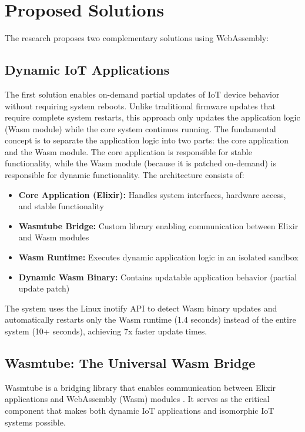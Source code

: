 \documentclass[11pt]{article}
\begin{document}
\section{Proposed Solutions}

The research proposes two complementary solutions using WebAssembly:

\subsection{Dynamic IoT Applications}

The first solution enables on-demand partial updates of IoT device behavior without requiring system reboots. Unlike traditional firmware updates that require complete system restarts, this approach only updates the application logic (Wasm module) while the core system continues running. The fundamental concept is to separate the application logic into two parts: the core application and the Wasm module. The core application is responsible for stable functionality, while the Wasm module (because it is patched on-demand) is responsible for dynamic functionality.
The architecture consists of:

\begin{itemize}
\item \textbf{Core Application (Elixir):} Handles system interfaces, hardware access, and stable functionality
\item \textbf{Wasmtube Bridge:} Custom library enabling communication between Elixir and Wasm modules
\item \textbf{Wasm Runtime:} Executes dynamic application logic in an isolated sandbox
\item \textbf{Dynamic Wasm Binary:} Contains updatable application behavior (partial update patch)
\end{itemize}

The system uses the Linux inotify API to detect Wasm binary updates and automatically restarts only the Wasm runtime (1.4 seconds) instead of the entire system (10+ seconds), achieving 7x faster update times.

\subsection{Wasmtube: The Universal Wasm Bridge}

Wasmtube is a bridging library that enables communication between Elixir applications and WebAssembly (Wasm) modules \cite{wasmtube2023}. It serves as the critical component that makes both dynamic IoT applications and isomorphic IoT systems possible.
\end{document}
